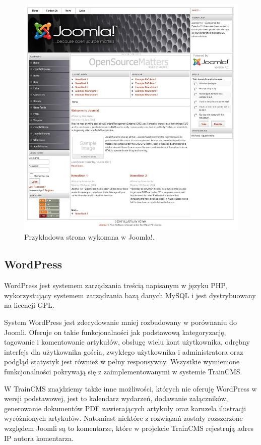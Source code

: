 \documentclass[openright]{xmgr}
\begin{document}
\begin{figure}[!tbh]
\centering
\includegraphics[width=\linewidth]{fig/joomla}
\caption{Przykładowa strona wykonana w Joomla!.}
\end{figure}

\newpage

\subsection{WordPress}

WordPress jest systemem zarządzania treścią napisanym w języku PHP, wykorzystujący systemem zarządzania bazą danych MySQL i jest dystrybuowany na licencji GPL.

System WordPress jest zdecydowanie mniej rozbudowany w porównaniu do Joomli. Oferuje on takie funkcjonalności jak podstawową kategoryzację, tagowanie i komentowanie artykułów, obsługę wielu kont użytkownika, odrębny interfejs dla użytkownika gościa, zwykłego użytkownika i administratora oraz podgląd statystyk jest również w pełny responsywny. Wszystkie wymienione funkcjonalności pokrywają się z zaimplementowanymi w systemie TrainCMS.

W TrainCMS znajdziemy także inne możliwości, których nie oferuję WordPress w wersji podstawowej, jest to kalendarz wydarzeń, dodawanie załączników, generowanie dokumentów PDF zawierających artykuły oraz karuzela ilustracji wyróżnionych artykułów. Natomiast niektóre z rozwiązań zostały rozszerzone względem Joomli są to komentarze, które w projekcie TrainCMS rejestrują adres IP autora komentarza.
\end{document}
